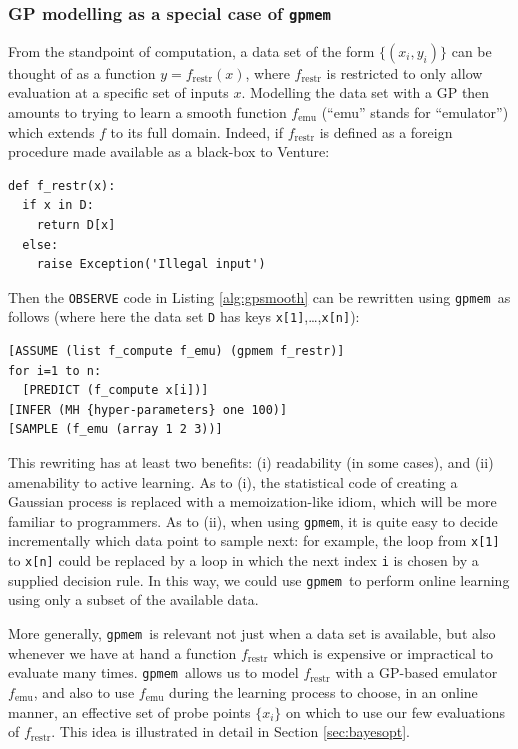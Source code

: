 \documentclass{article} %
\newcommand{\gpmem}{\texttt{gpmem}}
\newcommand{\emu}{{\textrm{emu}}}
\newcommand{\restr}{{\textrm{restr}}}
\begin{document}
\subsubsection{GP modelling as a special case of \gpmem}
From the standpoint of computation, a data set of the form $\{(x_i, y_i)\}$ can be thought of as a function $y = f_\restr(x)$, where $f_\restr$ is restricted to only allow evaluation at a specific set of inputs $x$.
Modelling the data set with a GP then amounts to trying to learn a smooth function $f_\emu$ (``emu'' stands for ``emulator'') which extends $f$ to its full domain.
Indeed, if $f_\restr$ is defined as a foreign procedure made available as a black-box to Venture:
\begin{verbatim}
def f_restr(x):
  if x in D:
    return D[x]
  else:
    raise Exception('Illegal input')
\end{verbatim}
Then the \texttt{OBSERVE} code in Listing \ref{alg:gpsmooth} can be rewritten using \gpmem\ as follows (where here the data set \texttt{D} has keys \texttt{x[1]},\ldots,\texttt{x[n]}):
\begin{verbatim}
[ASSUME (list f_compute f_emu) (gpmem f_restr)]
for i=1 to n:
  [PREDICT (f_compute x[i])]
[INFER (MH {hyper-parameters} one 100)]
[SAMPLE (f_emu (array 1 2 3))]
\end{verbatim}
This rewriting has at least two benefits: (i) readability (in some cases), and (ii) amenability to active learning.
As to (i), the statistical code of creating a Gaussian process is replaced with a memoization-like idiom, which will be more familiar to programmers.
As to (ii), when using \gpmem, it is quite easy to decide incrementally which data point to sample next: for example, the loop from \texttt{x[1]} to \texttt{x[n]} could be replaced by a loop in which the next index \texttt{i} is chosen by a supplied decision rule.
In this way, we could use \gpmem\ to perform online learning using only a subset of the available data.

More generally, \gpmem\ is relevant not just when a data set is available, but also whenever we have at hand a function $f_\restr$ which is expensive or impractical to evaluate many times.
\gpmem\ allows us to model $f_\restr$ with a GP-based emulator $f_\emu$, and also to use $f_\emu$ during the learning process to choose, in an online manner, an effective set of probe points $\{x_i\}$ on which to use our few evaluations of $f_\restr$.
This idea is illustrated in detail in Section \ref{sec:bayesopt}.
\end{document}
